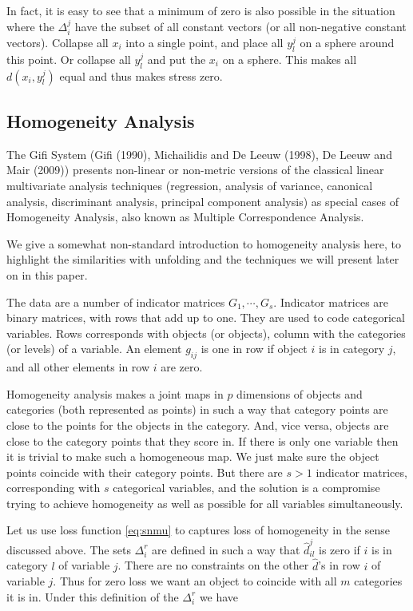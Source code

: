 \documentclass[
  12pt,
]{article}
\begin{document}
In fact, it is easy to see that a minimum of zero is also possible in the situation where the \(\Delta_i^j\) have the
subset of all constant vectors (or all non-negative constant vectors). Collapse all
\(x_i\) into a single point, and place all \(y_l^j\) on a sphere around this point.
Or collapse all \(y_l^j\) and put the \(x_i\) on a sphere. This makes all \(d(x_i,y_l^j)\)
equal and thus makes stress zero.

\subsection{Homogeneity Analysis}\label{homogeneity-analysis}

The Gifi System (Gifi (1990), Michailidis and De Leeuw (1998), De Leeuw and Mair (2009)) presents non-linear or non-metric versions of the classical linear multivariate analysis techniques (regression, analysis of variance, canonical analysis, discriminant analysis, principal component analysis) as special cases of Homogeneity Analysis, also known as Multiple Correspondence Analysis.

We give a somewhat non-standard introduction to homogeneity analysis here, to highlight the
similarities with unfolding and the techniques we will present later on in this paper.

The data are a number of indicator matrices \(G_1,\cdots,G_s\). Indicator matrices are binary matrices, with rows that add up to one. They are
used to code categorical variables. Rows corresponds with objects
(or objects), column with the categories (or levels) of a variable.
An element \(g_{ij}\) is one in row if object \(i\) is in category \(j\),
and all other elements in row \(i\) are zero.

Homogeneity analysis makes a joint maps in \(p\) dimensions of objects
and categories (both represented as points) in such a way that category points are close to the points for the objects in the category. And, vice versa, objects are close to the category points that they score in.
If there is only one variable then it is trivial to make such a
homogeneous map. We just make sure the object points coincide with
their category points. But there are \(s>1\) indicator matrices, corresponding with \(s\) categorical variables, and the solution is a compromise trying to achieve homogeneity as well as possible for all variables simultaneously.

Let us use loss function \eqref{eq:snmu} to captures loss of homogeneity in
the sense discussed above.
The sets \(\Delta_i^r\) are defined in such a way that \(\hat d_{il}^j\) is zero if \(i\) is in category \(l\) of
variable \(j\). There are no constraints on the other \(\hat d\)'s in row \(i\)
of variable \(j\). Thus for zero loss we want an object to coincide with all \(m\) categories it is in. Under this definition of the \(\Delta_i^r\) we have
\end{document}

